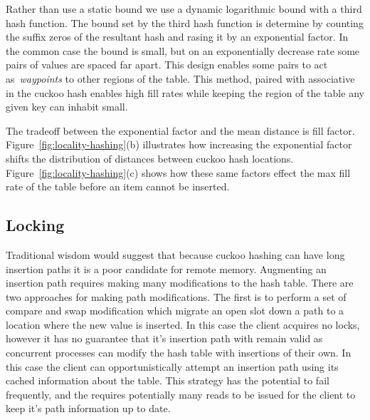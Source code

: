 Rather than use a static bound we use a dynamic logarithmic
bound with a third hash function. The bound set by the
third hash function is determine by counting the suffix
zeros of the resultant hash and rasing it by an exponential
factor. In the common case the bound is small, but on an
exponentially decrease rate some pairs of values are spaced
far apart. This design enables some pairs to act
as~\textit{waypoints} to other regions of the table. This
method, paired with associative in the cuckoo hash enables
high fill rates while keeping the region of the table any
given key can inhabit small.

The tradeoff between the exponential factor and the mean
distance is fill factor.
Figure~\ref{fig:locality-hashing}(b) illustrates how
increasing the exponential factor shifts the distribution of
distances between cuckoo hash locations.
Figure~\ref{fig:locality-hashing}(c) shows how these same
factors effect the max fill rate of the table before an item
cannot be inserted.


\subsection{Locking}

Traditional wisdom would suggest that because cuckoo hashing
can have long insertion paths it is a poor candidate for
remote memory. Augmenting an insertion path requires making
many modifications to the hash table. There are two
approaches for making path modifications. The first is to
perform a set of compare and swap modification which migrate
an open slot down a path to a location where the new value
is inserted. In this case the client acquires no locks,
however it has no guarantee that it's insertion path with
remain valid as concurrent processes can modify the hash
table with insertions of their own. In this case the client
can opportunistically attempt an insertion path using its
cached information about the table. This strategy has the
potential to fail frequently, and the requires potentially
many reads to be issued for the client to keep it's path
information up to date. ~

